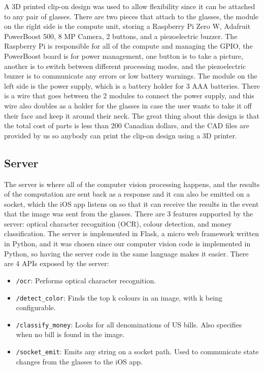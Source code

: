 \documentclass[a4paper,11pt]{article}
\begin{document}
A 3D printed clip-on design was used to allow flexibility since it can be attached to any pair of glasses. There are two pieces that attach to the glasses, the module on the right side is the compute unit, storing a Raspberry Pi Zero W, Adafruit PowerBoost 500, 8 MP Camera, 2 buttons, and a piezoelectric buzzer. The Raspberry Pi is responsible for all of the compute and managing the GPIO, the PowerBoost board is for power management, one button is to take a picture, another is to switch between different processing modes, and the piezoelectric buzzer is to communicate any errors or low battery warnings. The module on the left side is the power supply, which is a battery holder for 3 AAA batteries. There is a wire that goes between the 2 modules to connect the power supply, and this wire also doubles as a holder for the glasses in case the user wants to take it off their face and keep it around their neck. The great thing about this design is that the total cost of parts is less than 200 Canadian dollars, and the CAD files are provided by us so anybody can print the clip-on design using a 3D printer.

\subsection{Server}
\label{server}
The server is where all of the computer vision processing happens, and the results of the computation are sent back as a response and it can also be emitted on a socket, which the iOS app listens on so that it can receive the results in the event that the image was sent from the glasses. There are 3 features supported by the server: optical character recognition (OCR), colour detection, and money classification. The server is implemented in Flask, a micro web framework written in Python, and it was chosen since our computer vision code is implemented in Python, so having the server code in the same language makes it easier. There are 4 APIs exposed by the server:

\begin{itemize}
    \item \texttt{/ocr}: Performs optical character recognition.
    \item \texttt{/detect\_color}: Finds the top k colours in an image, with k being configurable.
    \item \texttt{/classify\_money}: Looks for all denominations of US bills. Also specifies when no bill is found in the image.
    \item \texttt{/socket\_emit}: Emits any string on a socket path. Used to communicate state changes from the glasses to the iOS app.
\end{itemize}
\end{document}
